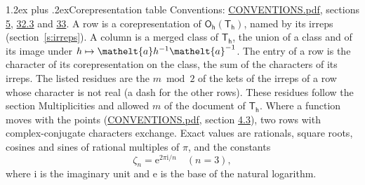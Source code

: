 \documentclass[10pt,a4paper]{article}
\makeatletter
\renewcommand\section{\@startsection{section}{1}{\z@}{-3ex plus -1ex minus -.2ex}%
  {1.2ex plus .2ex}{\normalfont\large\sffamily\bfseries\color{parttitle}}}
\numberwithin{equation}{section}
\newcommand{\eltfont}[1]{{\let\sigma\eltsigma\mathelt{#1}}}
\newcommand{\grp}[1]{\mathsf{#1}}
\newcommand{\elt}[1]{\eltfont{#1}}
\newcommand{\iunit}{\mathrm{i}}
\newcommand{\expe}{\mathrm{e}}
\newcommand{\rootunity}[1]{\zeta_{#1}}
\makeatother
\begin{document}
\section{Corepresentation table}\label{s:character_table}
Conventions: \href{../../CONVENTIONS.pdf}{CONVENTIONS.pdf}, sections \href{../../../rotation/CONVENTIONS.pdf\#conv.5}{5}, \href{../../CONVENTIONS.pdf\#conv.32.3}{32.3} and \href{../../CONVENTIONS.pdf\#conv.33}{33}.
A row is a corepresentation of $\grp{O_{h}}(\grp{T_{h}})$, named by its irreps (section~\ref{s:irreps}). A column is a merged class of $\grp{T_{h}}$, the union of a class and of its image under $h \mapsto \elt{a} h^{-1} \elt{a}^{-1}$. The entry of a row is the character of its corepresentation on the class, the sum of the characters of its irreps.
\leavevmode\label{n:head.parity}The listed residues are the $m \bmod 2$ of the kets of the irreps of a row whose character is not real (a dash for the other rows). These residues follow the section Multiplicities and allowed $m$ of the document of \href{../../../rotation/data/pdf/Th.pdf}{$\grp{T_{h}}$}. Where a function moves with the points (\href{../../CONVENTIONS.pdf}{CONVENTIONS.pdf}, section \href{../../../rotation/CONVENTIONS.pdf\#conv.4.3}{4.3}), two rows with complex-conjugate characters exchange.
\leavevmode\label{n:constant.root}\label{n:index.root.order}Exact values are rationals, square roots, cosines and sines of rational multiples of $\pi$, and the constants
\begin{equation}\label{e:constants}\rootunity{n} = \expe^{2\pi\iunit/n}\quad(n = 3),\end{equation}
where $\iunit$ is the imaginary unit and $\expe$ is the base of the natural logarithm.
\end{document}
